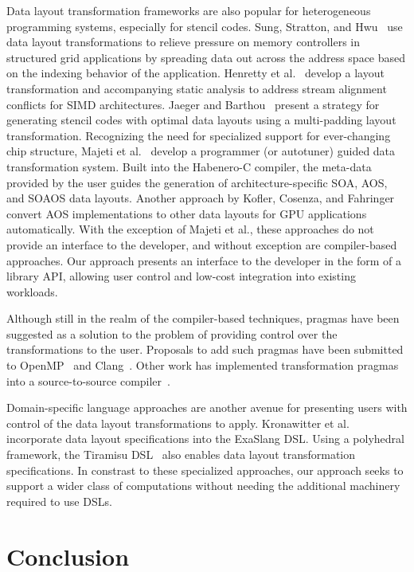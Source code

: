 Data layout transformation frameworks are also popular for heterogeneous programming systems, especially for stencil codes.
Sung, Stratton, and Hwu~\cite{sung2010data} use data layout transformations to relieve pressure on memory controllers in structured grid applications by spreading data out across the address space based on the indexing behavior of the application.
Henretty et al.~\cite{henretty2011data} develop a layout transformation and accompanying static analysis to address stream alignment conflicts for SIMD architectures.
Jaeger and Barthou~\cite{jaeger2012automatic} present a strategy for generating stencil codes with optimal data layouts using a multi-padding layout transformation.
Recognizing the need for specialized support for ever-changing chip structure, Majeti et al.~\cite{majeti2013compiler} develop a programmer (or autotuner) guided data transformation system.
Built into the Habenero-C compiler, the meta-data provided by the user guides the generation of architecture-specific SOA, AOS, and SOAOS data layouts.
Another approach by Kofler, Cosenza, and Fahringer~\cite{kofler2015automatic} convert AOS implementations to other data layouts for GPU applications automatically.  
With the exception of Majeti et al., these approaches do not provide an interface to the developer, and without exception are compiler-based approaches.
Our approach presents an interface to the developer in the form of a library API, allowing user control and low-cost integration into existing workloads.

Although still in the realm of the compiler-based techniques, pragmas have been suggested as a solution to the problem of providing control over the transformations to the user.
Proposals to add such pragmas have been submitted to OpenMP~\cite{kruse2019design} and Clang~\cite{kruse2018user}.
Other work has implemented transformation pragmas into a source-to-source compiler~\cite{xu2014semi}. 


Domain-specific language approaches are another avenue for presenting users with control of the data layout transformations to apply. 
Kronawitter et al.~\cite{kronawitter2018automatic} incorporate data layout specifications into the ExaSlang DSL.
Using a polyhedral framework, the Tiramisu DSL~\cite{baghdadi2019tiramisu} also enables data layout transformation specifications.
In constrast to these specialized approaches, our approach seeks to support a wider class of computations without needing the additional machinery required to use DSLs. 


\section{Conclusion}



